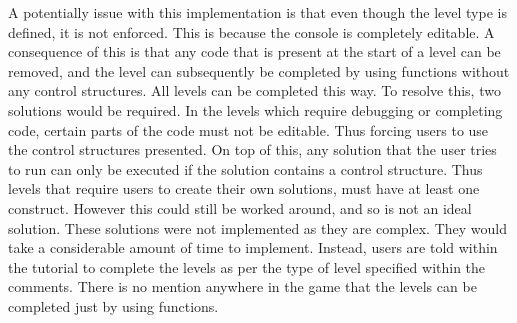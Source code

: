 \documentclass[a4paper,11.5pt]{report}
\numberwithin{figure}{section}
\numberwithin{table}{section}
\numberwithin{equation}{section}
\numberwithin{equation}{section}
\begin{document}
A potentially issue with this implementation is that even though the level type is defined, it is not enforced. This is because the console is completely editable. A consequence of this is that any code that is present at the start of a level can be removed, and the level can subsequently be completed by using functions without any control structures. All levels can be completed this way. To resolve this, two solutions would be required. In the levels which require debugging or completing code, certain parts of the code must not be editable. Thus forcing users to use the control structures presented. On top of this, any solution that the user tries to run can only be executed if the solution contains a control structure. Thus levels that require users to create their own solutions, must have at least one construct. However this could still be worked around, and so is not an ideal solution. These solutions were not implemented as they are complex. They would take a considerable amount of time to implement. Instead, users are told within the tutorial to complete the levels as per the type of level specified within the comments. There is no mention anywhere in the game that the levels can be completed just by using functions.





\end{document}
